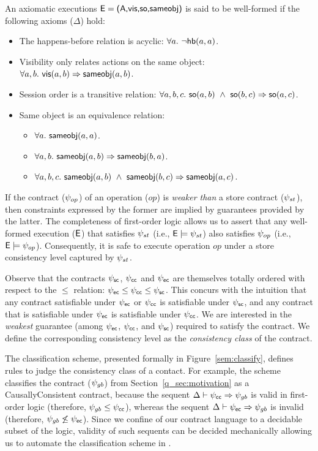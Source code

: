 \begin{definition}
An axiomatic executions ${\normalfont \textsf{E}} = {\normalfont \textsf{({\normalfont \textsf{A}},\allowbreak {\normalfont \textsf{vis}},\allowbreak {\normalfont \textsf{so}},\allowbreak {\normalfont \textsf{sameobj}})}}$ is said to be well-formed if the following
axioms ($\Delta$) hold:

\begin{itemize}
\item The happens-before relation is acyclic: $\forall a.~\neg{\normalfont \textsf{hb}(a,a)}$.
\item Visibility only relates actions on the same object: $\forall a,b.~{\normalfont \textsf{vis}(a,b)} \Rightarrow {\normalfont \textsf{sameobj}(a,b)}$.
\item Session order is a transitive relation: $\forall a,b,c.~{\normalfont \textsf{so}(a,b)} ~\wedge~ {\normalfont \textsf{so}(b,c)} \Rightarrow {\normalfont \textsf{so}(a,c)}$.
\item Same object is an equivalence relation:
	\begin{itemize}
	\item $\forall a.~{\normalfont \textsf{sameobj}(a,a)}$.
	\item $\forall a,b.~{\normalfont \textsf{sameobj}(a,b)} \Rightarrow {\normalfont \textsf{sameobj}(b,a)}$.
	\item $\forall a,b,c.~{\normalfont \textsf{sameobj}(a,b)} ~\wedge~ {\normalfont \textsf{sameobj}(b,c)} \Rightarrow {\normalfont \textsf{sameobj}(a,c)}$.
	\end{itemize}
\end{itemize}
\end{definition}

If the contract ($\psi_{op}$) of an operation ($\mathit{op}$) is \emph{weaker
than} a store contract ($\psi_{st}$), then constraints expressed by the former
are implied by guarantees provided by the latter. The completeness of
first-order logic allows us to assert that any well-formed execution (${\normalfont \textsf{E}}$)
that satisfies $\psi_{st}$ (i.e., ${\normalfont \textsf{E}}\models \psi_{st}$) also satisfies
$\psi_{op}$ (i.e., ${\normalfont \textsf{E}} \models \psi_{op}$). Consequently, it is safe to execute
operation $\mathit{op}$ under a store consistency level captured by $\psi_{st}$.

Observe that the contracts $\psi_{\sf sc}$, $\psi_{\sf cc}$ and $\psi_{\sf ec}$ are themselves totally
ordered with respect to the $\le$ relation: $\psi_{\sf ec} \le \psi_{\sf cc} \le \psi_{\sf sc}$.  This
concurs with the intuition that any contract satisfiable under $\psi_{\sf ec}$ or $\psi_{\sf cc}$
is satisfiable under $\psi_{\sf sc}$, and any contract that is satisfiable under $\psi_{\sf ec}$
is satisfiable under $\psi_{\sf cc}$. We are interested in the \emph{weakest} guarantee
(among $\psi_{\sf ec}$, $\psi_{\sf cc}$, and $\psi_{\sf sc}$) required to satisfy the contract. We define
the corresponding consistency level as the \emph{consistency class} of the
contract.

The classification scheme, presented formally in Figure~\ref{sem:classify},
defines rules to judge the consistency class of a contact. For example, the
scheme classifies the  contract ($\psi_{gb}$) from
Section~\ref{q_sec:motivation} as a {\sf\small CausallyConsistent} contract, because
the sequent $\Delta \vdash \psi_{\sf cc} \Rightarrow \psi_{gb}$ is valid in first-order
logic (therefore, $\psi_{gb} \le \psi_{\sf cc}$), whereas the sequent $\Delta \vdash \psi_{\sf ec}
\Rightarrow \psi_{gb}$ is invalid (therefore, $\psi_{gb} \not\le \psi_{\sf ec}$). Since we
confine of our contract language to a decidable subset of the logic, validity
of such sequents can be decided mechanically allowing us to automate the
classification scheme in \quelea.

